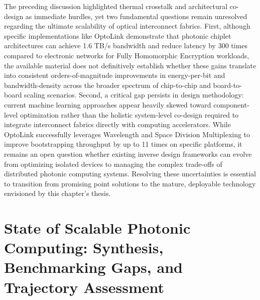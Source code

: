 \documentclass[11pt]{article}
\begin{document}
The preceding discussion highlighted thermal crosstalk and architectural co-design as immediate hurdles, yet two fundamental questions remain unresolved regarding the ultimate scalability of optical interconnect fabrics. First, although specific implementations like OptoLink demonstrate that photonic chiplet architectures can achieve 1.6 TB/s bandwidth and reduce latency by 300 times compared to electronic networks for Fully Homomorphic Encryption workloads, the available material does not definitively establish whether these gains translate into consistent orders-of-magnitude improvements in energy-per-bit and bandwidth-density across the broader spectrum of chip-to-chip and board-to-board scaling scenarios. Second, a critical gap persists in design methodology: current machine learning approaches appear heavily skewed toward component-level optimization rather than the holistic system-level co-design required to integrate interconnect fabrics directly with computing accelerators. While OptoLink successfully leverages Wavelength and Space Division Multiplexing to improve bootstrapping throughput by up to 11 times on specific platforms, it remains an open question whether existing inverse design frameworks can evolve from optimizing isolated devices to managing the complex trade-offs of distributed photonic computing systems. Resolving these uncertainties is essential to transition from promising point solutions to the mature, deployable technology envisioned by this chapter's thesis. \citep{doi_10_1145_3806395_315ab915}

\section{State of Scalable Photonic Computing: Synthesis, Benchmarking Gaps, and Trajectory Assessment}\label{state-of-scalable-photonic-computing-synthesis-benchmarking-gaps-and-trajectory-assessment}
\end{document}
